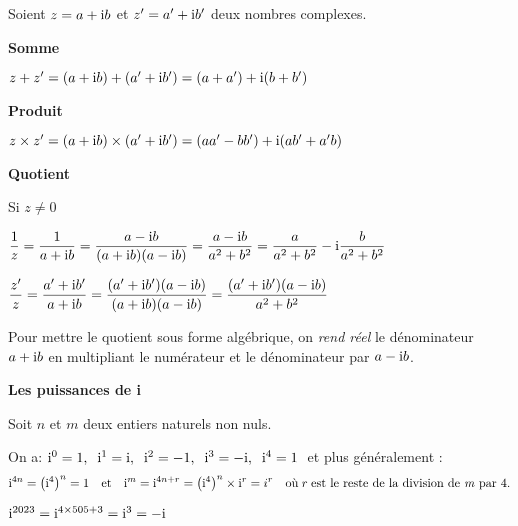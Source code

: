 \medskip

Soient $z =a+\text{i} b $ et $z' =a'+\text{i} b' $ deux nombres complexes.


\medskip
\textbf{Somme}


\medskip
$ z+z'  =(a+\text{i} b)+(a'+\text{i} b')=(a+a')+\text{i} (b+b')$

\medskip


\textbf{Produit}

\medskip
$ z\times z'  =(a+\text{i} b)\times(a'+\text{i} b')=(aa'-bb')+\text{i} (ab'+a'b)$

\medskip


\textbf{Quotient}

\medskip

Si $ z\neq 0 $


\medskip
$ \dfrac{1}{z}  =\dfrac{1}{a+\text{i} b}=\dfrac{a-\text{i} b}{(a+\text{i} b)(a-\text{i} b)}=\dfrac{a-\text{i} b}{a^2+ b^2}=\dfrac{a}{a^2+ b^2} -\text{i}\dfrac{ b}{a^2+ b^2}$

\bigskip
$ \dfrac{z'}{z}  =\dfrac{a'+\text{i} b'}{a+\text{i} b}=\dfrac{(a'+\text{i} b')(a-\text{i} b)}{(a+\text{i} b)(a-\text{i} b)}=\dfrac{(a'+\text{i} b')(a-\text{i} b)}{a^2+ b^2}$

\medskip

\begin{remark}
Pour mettre le quotient sous forme algébrique, on \textit{rend réel} le dénominateur  $ a+\text{i} b $ en multipliant le numérateur et le dénominateur par $  a-\text{i} b$.
\end{remark}

\bigskip
\textbf{Les puissances de i}

\medskip

Soit $ n $ et $ m $ deux entiers naturels non nuls.


\medskip

On a: $ \text{i}^0=1,\;\; \text{i}^1=\text{i} ,\;\; \text{i}^2=-1 ,\;\; \text{i}^3=-\text{i} ,\;\; \text{i}^4=1\; $ et plus généralement :
\[\text{i}^{4n}=\left(\text{i}^4\right)^n=1 \quad \text{et}\quad \text{i}^{m}= \text{i}^{4n+r}=\left(\text{i}^4\right)^n \times\text{i}^r=i^r\quad \text{où}\; r \; \text{est le reste de la division de \textit{m} par 4}.  \]
\begin{example}
$ \text{i}^{2023}=  \text{i}^{4\times 505+3}=\text{i}^3=-\text{i}$
\end{example}
\medskip

